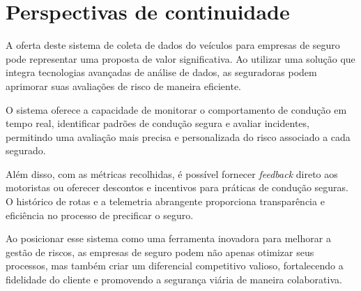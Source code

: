 \section{Perspectivas de continuidade}
A oferta deste sistema de coleta de dados do veículos para empresas de seguro pode representar uma proposta de valor significativa. Ao utilizar uma solução que integra tecnologias avançadas de análise de dados, as seguradoras podem aprimorar suas avaliações de risco de maneira eficiente. 

O sistema oferece a capacidade de monitorar o comportamento de condução em tempo real, identificar padrões de condução segura e avaliar incidentes, permitindo uma avaliação mais precisa e personalizada do risco associado a cada segurado. 

Além disso, com as métricas recolhidas, é possível fornecer \textit{feedback} direto aos motoristas ou oferecer descontos e incentivos para práticas de condução seguras. O histórico de rotas e a telemetria abrangente proporciona transparência e eficiência no processo de precificar o seguro. 

Ao posicionar esse sistema como uma ferramenta inovadora para melhorar a gestão de riscos, as empresas de seguro podem não apenas otimizar seus processos, mas também criar um diferencial competitivo valioso, fortalecendo a fidelidade do cliente e promovendo a segurança viária de maneira colaborativa.